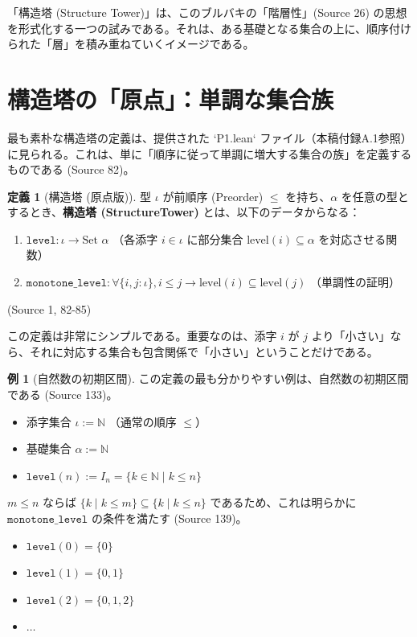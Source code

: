 \documentclass[11pt]{ltjsarticle}
\theoremstyle{definition}
\newtheorem{definition}{定義}[section]
\newtheorem{example}{例}[section]
\theoremstyle{plain}
\theoremstyle{remark}
\begin{document}
「構造塔 (Structure Tower)」は、このブルバキの「階層性」(Source 26) の思想を形式化する一つの試みである。それは、ある基礎となる集合の上に、順序付けられた「層」を積み重ねていくイメージである。

\section{構造塔の「原点」：単調な集合族}

最も素朴な構造塔の定義は、提供された `P1.lean` ファイル（本稿付録A.1参照）に見られる。これは、単に「順序に従って単調に増大する集合の族」を定義するものである (Source 82)。

\begin{definition}[構造塔 (原点版)]
型 $\iota$ が前順序 (Preorder) $\le$ を持ち、$\alpha$ を任意の型とするとき、\textbf{構造塔 (StructureTower)} とは、以下のデータからなる：
\begin{enumerate}
    \item $\texttt{level} : \iota \to \text{Set } \alpha$ （各添字 $i \in \iota$ に部分集合 $\text{level}(i) \subseteq \alpha$ を対応させる関数）
    \item $\texttt{monotone\_level} : \forall \{i, j : \iota\}, i \le j \to \text{level}(i) \subseteq \text{level}(j)$ （単調性の証明）
\end{enumerate}
(Source 1, 82-85)
\end{definition}

この定義は非常にシンプルである。重要なのは、添字 $i$ が $j$ より「小さい」なら、それに対応する集合も包含関係で「小さい」ということだけである。

\begin{example}[自然数の初期区間]
この定義の最も分かりやすい例は、自然数の初期区間である (Source 133)。
\begin{itemize}
    \item 添字集合 $\iota := \mathbb{N}$ （通常の順序 $\le$）
    \item 基礎集合 $\alpha := \mathbb{N}$
    \item $\texttt{level}(n) := I_n = \{k \in \mathbb{N} \mid k \le n\}$
\end{itemize}
$m \le n$ ならば $\{k \mid k \le m\} \subseteq \{k \mid k \le n\}$ であるため、これは明らかに $\texttt{monotone\_level}$ の条件を満たす (Source 139)。
\begin{itemize}
    \item $\texttt{level}(0) = \{0\}$
    \item $\texttt{level}(1) = \{0, 1\}$
    \item $\texttt{level}(2) = \{0, 1, 2\}$
    \item $\dots$
\end{itemize}
\end{example}
\end{document}

